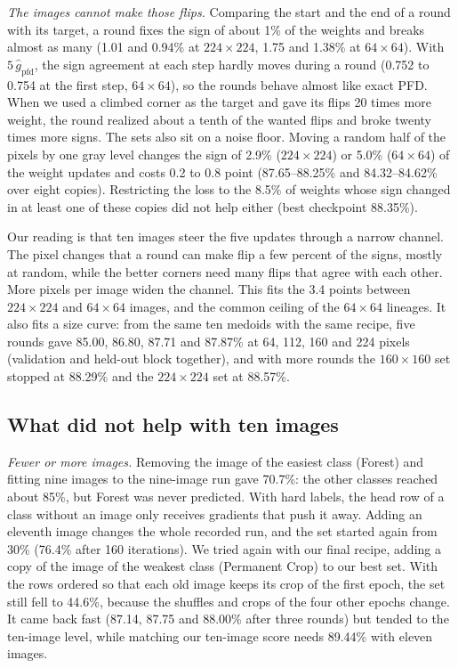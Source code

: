\documentclass[journal]{IEEEtran}
\begin{document}
\emph{The images cannot make those flips.} Comparing the start and the end of a round with its target, a round
fixes the sign of about 1\% of the weights and breaks almost as many (1.01 and 0.94\% at $224\times224$, 1.75 and
1.38\% at $64\times64$). With $5\,\hat g_{\mathrm{pfd}}$, the sign agreement at each step hardly moves during a round
(0.752 to 0.754 at the first step, $64\times64$), so the rounds behave almost like exact PFD. When we used a climbed
corner as the target and gave its flips 20 times more weight, the round realized about a tenth of the wanted flips
and broke twenty times more signs. The sets also sit on a noise floor. Moving a random half of the pixels by one
gray level changes the sign of 2.9\% ($224\times224$) or 5.0\% ($64\times64$) of the weight updates and costs 0.2 to
0.8 point (87.65--88.25\% and 84.32--84.62\% over eight copies). Restricting the loss to the 8.5\% of weights whose
sign changed in at least one of these copies did not help either (best checkpoint 88.35\%).

Our reading is that ten images steer the five updates through a narrow channel. The pixel changes that a round can
make flip a few percent of the signs, mostly at random, while the better corners need many flips that agree with
each other. More pixels per image widen the channel. This fits the 3.4 points between $224\times224$ and $64\times64$
images, and the common ceiling of the $64\times64$ lineages. It also fits a size curve: from the same ten medoids with
the same recipe, five rounds gave 85.00, 86.80, 87.71 and 87.87\% at 64, 112, 160 and 224 pixels (validation and
held-out block together), and with more rounds the $160\times160$ set stopped at 88.29\% and the $224\times224$ set at
88.57\%.

\subsection{What did not help with ten images}
\label{sec:negative10}
\emph{Fewer or more images.} Removing the image of the easiest class (Forest) and fitting nine images to the nine-image
run gave 70.7\%: the other classes reached about 85\%, but Forest was never predicted. With hard labels, the head
row of a class without an image only receives gradients that push it away. Adding an eleventh image changes the
whole recorded run, and the set started again from 30\% (76.4\% after 160 iterations). We tried again with our final
recipe, adding a copy of the image of the weakest class (Permanent Crop) to our best set. With the rows ordered so
that each old image keeps its crop of the first epoch, the set still fell to 44.6\%, because the shuffles and crops
of the four other epochs change. It came back fast (87.14, 87.75 and 88.00\% after three rounds) but tended to the
ten-image level, while matching our ten-image score needs 89.44\% with eleven images.
\end{document}
